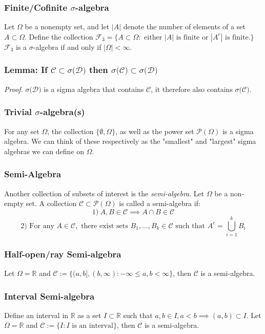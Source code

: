 \documentclass{article}
\begin{document}
\subsubsection{Finite/Cofinite $\sigma$-algebra}
Let $\Omega$ be a nonempty set, and let $|A|$ denote the number of elements of a set $A\subset \Omega$. Define the collection $\mathcal{F}_3=\{A \subset \Omega: \text{ either } |A| \text{ is finite or } |A^c| \text{ is finite.}\}$
$\mathcal{F}_3$ is a $\sigma$-algebra if and only if $|\Omega|<\infty$.

\subsubsection{Lemma: If $\mathcal{C}\subset\sigma(\mathcal{D)}$ then $\sigma(\mathcal{C)}\subset\sigma(\mathcal{D)}$}
\textit{Proof.} \newline \newline
$\sigma(\mathcal{D)}$ is a sigma algebra that contains $\mathcal{C}$, it therefore also contains $\sigma(\mathcal{C)}$.


\subsubsection{Trivial $\sigma$-algebra(s)}
For any set $\Omega$, the collection $\{\emptyset,\Omega\}$, as well as the power set $\mathcal{P}(\Omega)$ is a sigma algebra. We can think of these respectively as the "smallest" and "largest" sigma algebras we can define on $\Omega$.

\subsubsection{Semi-Algebra}
Another collection of subsets of interest is the \emph{semi-algebra}. Let $\Omega$ be a non-empty set. A collection $\mathcal{C} \subset \mathcal{P}(\Omega)$ is called a semi-algebra if: 
\[
1) \ A,B \in \mathcal{C} \implies A \cap B \in \mathcal{C}
\]
\[
2) \text{ For any } A \in \mathcal{C}, \text{ there exist sets } B_1,\ldots,B_k \in \mathcal{C} \text{ such that } A^c = \bigcup_{i=1}^k B_i
\]

\subsubsection{Half-open/ray Semi-algebra}
Let $\Omega = \mathbb{R}$ and $\mathcal{C}:=\{(a,b], (b, \infty): -\infty \leq a,b < \infty\}$, then $\mathcal{C}$ is a semi-algebra.

\subsubsection{Interval Semi-algebra}
Define an interval in $\mathbb{R}$ as a set $I\subset \mathbb{R}$ such that $a,b\in I, a<b \implies (a,b) \subset I.$ Let $\Omega = \mathbb{R}$ and $\mathcal{C}:= \{I: I \text{ is an interval} \}$, then $\mathcal{C}$ is a semi-algebra.
\end{document}
